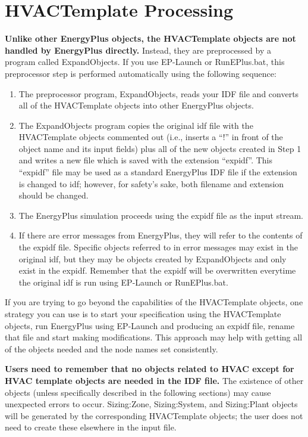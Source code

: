 \section{HVACTemplate Processing}\label{hvactemplate-processing}

\textbf{Unlike other EnergyPlus objects, the HVACTemplate objects are not handled by EnergyPlus directly.} Instead, they are preprocessed by a program called ExpandObjects. If you use EP-Launch or RunEPlus.bat, this preprocessor step is performed automatically using the following sequence:

\begin{enumerate}
\def\labelenumi{\arabic{enumi})}
\item
  The preprocessor program, ExpandObjects, reads your IDF file and converts all of the HVACTemplate objects into other EnergyPlus objects.
\item
  The ExpandObjects program copies the original idf file with the HVACTemplate objects commented out (i.e., inserts a ``!'' in front of the object name and its input fields) plus all of the new objects created in Step 1 and writes a new file which is saved with the extension ``expidf''. This ``expidf'' file may be used as a standard EnergyPlus IDF file if the extension is changed to idf; however, for safety's sake, both filename and extension should be changed.
\item
  The EnergyPlus simulation proceeds using the expidf file as the input stream.
\item
  If there are error messages from EnergyPlus, they will refer to the contents of the expidf file. Specific objects referred to in error messages may exist in the original idf, but they may be objects created by ExpandObjects and only exist in the expidf. Remember that the expidf will be overwritten everytime the original idf is run using EP-Launch or RunEPlus.bat.
\end{enumerate}

If you are trying to go beyond the capabilities of the HVACTemplate objects, one strategy you can use is to start your specification using the HVACTemplate objects, run EnergyPlus using EP-Launch and producing an expidf file, rename that file and start making modifications. This approach may help with getting all of the objects needed and the node names set consistently.

\textbf{Users need to remember that no objects related to HVAC except for HVAC template objects are needed in the IDF file.} The existence of other objects (unless specifically described in the following sections) may cause unexpected errors to occur. Sizing:Zone, Sizing:System, and Sizing:Plant objects will be generated by the corresponding HVACTemplate objects; the user does not need to create these elsewhere in the input file.

